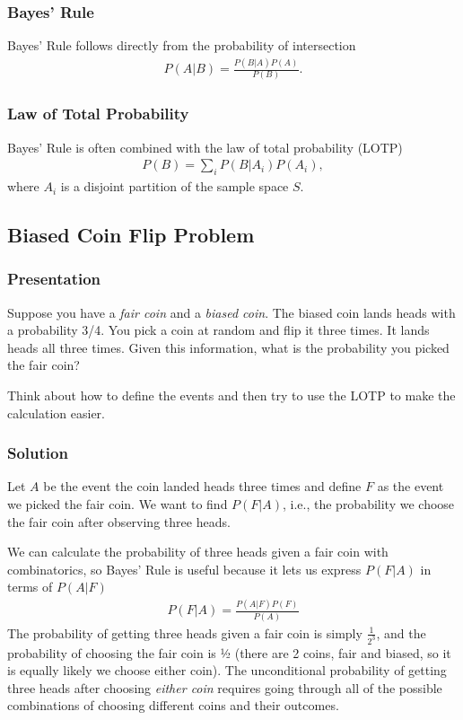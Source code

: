 \subsubsection{Bayes' Rule}

Bayes' Rule follows directly from the probability of intersection
\begin{align}
P\left( A | B \right) = \frac{P\left( B | A \right)P(A)}{P(B)}.
\end{align}

\subsubsection{Law of Total Probability}

Bayes' Rule is often combined with the law of total probability (LOTP)
\begin{align}
P(B) = \sum_{i}^{}{P\left( B | A_{i} \right)P(A_{i})},
\end{align}
where \(A_{i}\) is a disjoint partition of the sample space \(S\).

\subsection{Biased Coin Flip Problem}

\subsubsection{Presentation}

Suppose you have a \emph{fair coin} 
and a \emph{biased coin}. 
The biased coin lands heads with a probability 3/4. 
You pick a coin at random and flip it three times. 
It lands heads all three times. 
Given this information,
what is the probability you picked the fair coin?

Think about how to define the events and then try to use the LOTP to make the calculation easier.

\clearpage
\subsubsection{Solution}

Let \(A\) be the event the coin landed heads three times and define \(F\) as the event we picked the fair coin. 
We want to find \(P(F|A)\), i.e., the probability we choose the fair coin after observing three heads.

We can calculate the probability of three heads given a fair coin with combinatorics, 
so Bayes' Rule is useful because it lets us express \(P(F|A)\) in terms of \(P(A|F)\)
\begin{align}
P\left( F | A \right) = \frac{P\left( A | F \right)P(F)}{P(A)}
\end{align}
The probability of getting three heads given a fair coin is simply \(\frac{1}{2^{3}}\), 
and the probability of choosing the fair coin is ½ (there are 2 coins, fair and biased, 
so it is equally likely we choose either coin). 
The unconditional probability of getting three heads after choosing \emph{either coin} requires 
going through all of the possible combinations of choosing different coins and their outcomes.

